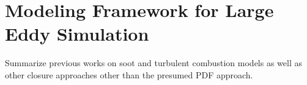 \section{Modeling Framework for Large Eddy Simulation}
\label{sec:intro:framework}

Summarize previous works on soot and turbulent combustion models as well as other closure approaches other than the presumed PDF approach.
